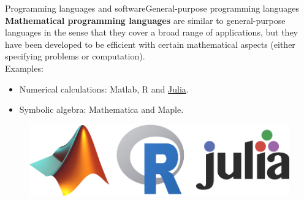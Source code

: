 \documentclass[handout]{beamer}
\begin{document}

\begin{frame}{Programming languages and software}{General-purpose programming languages}
\textbf{Mathematical programming languages} are similar to general-purpose languages in the sense that they cover a broad range of applications, but they have been developed to be efficient with certain mathematical aspects (either specifying problems or computation). \\[6pt]

Examples:

\begin{itemize}
  \item Numerical calculations: Matlab, R and \underline{Julia}.
  \item Symbolic algebra: Mathematica and Maple.
\end{itemize}


\begin{figure}
\begin{center}
\includegraphics[width=.60\textwidth]{MathLang.png}
\end{center}
\end{figure}

\end{frame}

\end{document}
